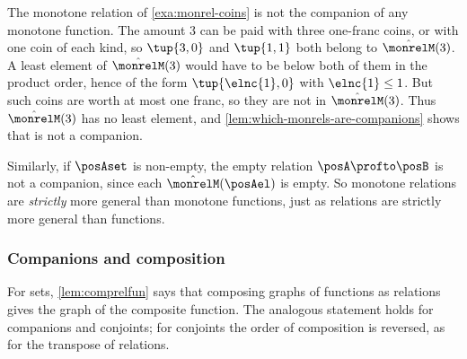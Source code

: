 \begin{example}
    The monotone relation of \cref{exa:monrel-coins} is not the companion of any monotone function.
    The amount $3$ can be paid with three one-franc coins, or with one coin of each kind, so $\tup{3, 0}$ and $\tup{1, 1}$ both belong to $\hat{\monrelM}(3)$.
    A least element of $\hat{\monrelM}(3)$ would have to be below both of them in the product order, hence of the form $\tup{\elnc{1}, 0}$ with $\elnc{1} \leq 1$.
    But such coins are worth at most one franc, so they are not in $\hat{\monrelM}(3)$.
    Thus $\hat{\monrelM}(3)$ has no least element, and \cref{lem:which-monrels-are-companions} shows that \monrelM is not a companion.

    Similarly, if $\posAset$ is non-empty, the empty relation $\posA \profto \posB$ is not a companion, since each $\hat{\monrelM}(\posAel)$ is empty.
    So monotone relations are \emph{strictly} more general than monotone functions, just as relations are strictly more general than functions.
\end{example}

\subsubsection{Companions and composition}

For sets, \cref{lem:comprelfun} says that composing graphs of functions as relations gives the graph of the composite function.
The analogous statement holds for companions and conjoints; for conjoints the order of composition is reversed, as for the transpose of relations.

